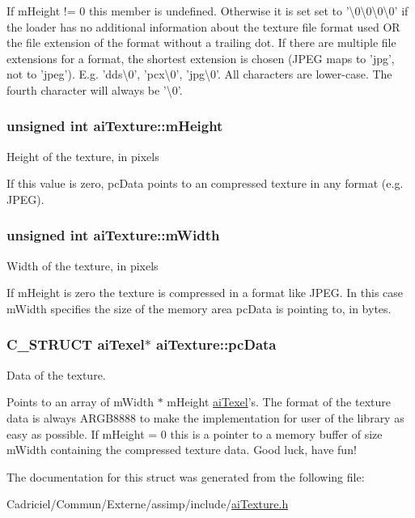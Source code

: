 If m\-Height != 0 this member is undefined. Otherwise it is set set to '\textbackslash{}0\textbackslash{}0\textbackslash{}0\textbackslash{}0' if the loader has no additional information about the texture file format used O\-R the file extension of the format without a trailing dot. If there are multiple file extensions for a format, the shortest extension is chosen (J\-P\-E\-G maps to 'jpg', not to 'jpeg'). E.\-g. 'dds\textbackslash{}0', 'pcx\textbackslash{}0', 'jpg\textbackslash{}0'. All characters are lower-\/case. The fourth character will always be '\textbackslash{}0'. \hypertarget{structai_texture_ac1e2fa6f1f646e9c55e3985d4418a752}{
\subsubsection[{m\-Height}]{\setlength{\rightskip}{0pt plus 5cm}unsigned int ai\-Texture\-::m\-Height}}\label{structai_texture_ac1e2fa6f1f646e9c55e3985d4418a752}
Height of the texture, in pixels

If this value is zero, pc\-Data points to an compressed texture in any format (e.\-g. J\-P\-E\-G). \hypertarget{structai_texture_aaa3ad8cfe44fdc4dea2db91977d92234}{
\subsubsection[{m\-Width}]{\setlength{\rightskip}{0pt plus 5cm}unsigned int ai\-Texture\-::m\-Width}}\label{structai_texture_aaa3ad8cfe44fdc4dea2db91977d92234}
Width of the texture, in pixels

If m\-Height is zero the texture is compressed in a format like J\-P\-E\-G. In this case m\-Width specifies the size of the memory area pc\-Data is pointing to, in bytes. \hypertarget{structai_texture_aeb07528748b6e49d2d81c60006024f9a}{
\subsubsection[{pc\-Data}]{\setlength{\rightskip}{0pt plus 5cm}C\-\_\-\-S\-T\-R\-U\-C\-T {\bf ai\-Texel}$\ast$ ai\-Texture\-::pc\-Data}}\label{structai_texture_aeb07528748b6e49d2d81c60006024f9a}
Data of the texture.

Points to an array of m\-Width $\ast$ m\-Height \hyperlink{structai_texel}{ai\-Texel}'s. The format of the texture data is always A\-R\-G\-B8888 to make the implementation for user of the library as easy as possible. If m\-Height = 0 this is a pointer to a memory buffer of size m\-Width containing the compressed texture data. Good luck, have fun! 

The documentation for this struct was generated from the following file\-:\begin{DoxyCompactItemize}
\item 
Cadriciel/\-Commun/\-Externe/assimp/include/\hyperlink{ai_texture_8h}{ai\-Texture.\-h}\end{DoxyCompactItemize}
